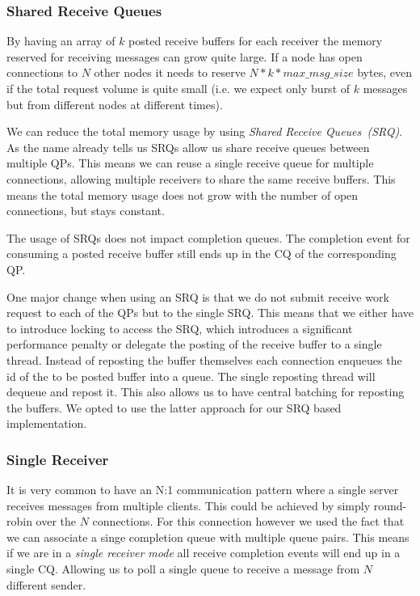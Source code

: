 \subsubsection{Shared Receive Queues} 
By having an array of $k$ posted receive buffers for each receiver the memory reserved for receiving messages can grow quite
large. If a node has  open connections to $N$ other nodes it needs to reserve  $N*k*max\_msg\_size$ bytes, even if 
the total request volume is quite small (i.e. we expect only burst of $k$ messages but from different nodes at different times).

We can reduce the total memory usage by using \emph{Shared Receive Queues~(SRQ)}. As the name already tells us SRQs allow us
share receive queues between multiple QPs. This means we can reuse a single receive queue for multiple connections, allowing
multiple receivers to share the same receive buffers. This means the total memory usage does not grow with the number of
open connections, but stays constant.

The usage of SRQs does not impact completion queues. The completion event for consuming a posted receive buffer still ends up 
in the CQ of the corresponding QP.

One major change when using an SRQ is that we do not submit receive work request to each of the QPs but to the single SRQ. This
means that we either have to introduce locking to access the SRQ, which introduces a significant performance penalty or 
delegate the posting of the receive buffer to a single thread. Instead of reposting the buffer themselves each connection 
enqueues the id of the to be posted buffer into a queue. The single reposting thread will dequeue and repost it. This also
allows us to have central batching for reposting the buffers. We opted to use the latter approach for our SRQ based 
implementation.

\subsubsection{Single Receiver} 
It is very common to have an N:1 communication pattern where a single server receives messages from multiple clients. This
could be achieved by simply round-robin over the $N$ connections. For this connection however we used the fact that we can 
associate a singe completion queue with multiple queue pairs. This means if we are in a \emph{single receiver mode} all 
receive completion events will end up in a single CQ. Allowing us to poll a single queue to receive a message from $N$ 
different sender.


